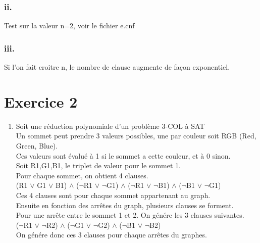 \documentclass[12pt]{report}
\begin{document}
\subsubsection*{ii.}
Test sur la valeur n=2, voir le fichier e.cnf

\subsubsection*{iii.}
Si l'on fait croitre n, le nombre de clause augmente de façon exponentiel.
\newpage
\section*{Exercice 2}
\begin{enumerate}
\item Soit une réduction polynomiale d'un problème 3-COL à SAT \\
Un sommet peut prendre 3 valeurs possibles, une par couleur soit RGB (Red, Green, Blue). \\
Ces valeurs sont évalué à 1 si le sommet a cette couleur, et à 0 sinon. \\
Soit R1,G1,B1, le triplet de valeur pour le sommet 1. \\

\noindent Pour chaque sommet, on obtient 4 clauses. \\
(R1 $\lor$ G1 $\lor$ B1) $\land$ ($\lnot$R1 $\lor$ $\lnot$G1) $\land$ ($\lnot$R1 $\lor$ $\lnot$B1) $\land$ ($\lnot$B1 $\lor$ $\lnot$G1)\\
Ces 4 clauses sont pour chaque sommet appartenant au graph.\\

\noindent Ensuite en fonction des arrêtes du graph, plusieurs clauses se forment. \\
Pour une arrête entre le sommet 1 et 2. On génére les 3 clauses suivantes. \\
($\lnot$R1 $\lor$ $\lnot$R2) $\land$ ($\lnot$G1 $\lor$ $\lnot$G2) $\land$ ($\lnot$B1 $\lor$ $\lnot$B2)\\
On génére donc ces 3 clauses pour chaque arrêtes du graphes. \\


\end{enumerate}
\end{document}
